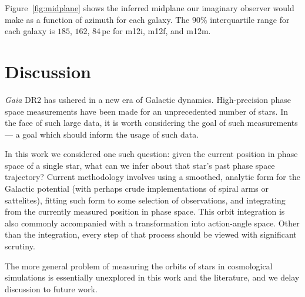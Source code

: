 \documentclass[twocolumn]{aastex62}
\newcommand{\pc}{\text{pc}}
\begin{document}
Figure~\ref{fig:midplane} shows the inferred midplane our imaginary observer
would make as a function of azimuth for each galaxy. The $90\%$ interquartile
range for each galaxy is $185$, $162$, $84\,\pc$ for m12i, m12f, and m12m. 

\begin{figure*}
\caption{Caption.}
\label{fig:midplane}
\end{figure*}

\section{Discussion} \label{sec:discussion}
{\em Gaia} DR2 has ushered in a new era of Galactic dynamics. High-precision
phase space measurements have been made for an unprecedented number of stars.
In the face of such large data, it is worth considering the goal of such
measurements --- a goal which should inform the usage of such data.

In this work we considered one such question: given the current position in
phase space of a single star, what can we infer about that star's past phase
space trajectory? Current methodology involves using a smoothed, analytic form
for the Galactic potential (with perhaps crude implementations of spiral arms
or sattelites), fitting such form to some selection of observations, and
integrating from the currently measured position in phase space. This orbit
integration is also commonly accompanied with a transformation into
action-angle space. Other than the integration, every step of that process
should be viewed with significant scrutiny.

The more general problem of measuring the orbits of stars in cosmological
simulations is essentially unexplored in this work and the literature, and we
delay discussion to future work.


\end{document}
